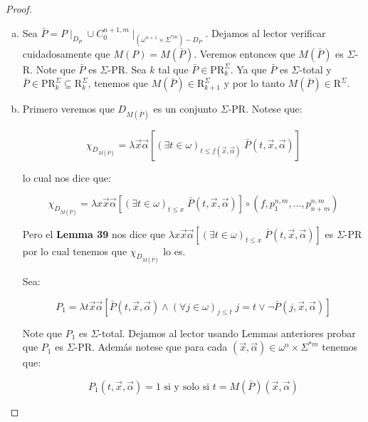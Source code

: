   \begin{proof}
    \begin{enumerate}[a)]
      \item Sea $\bar{P} = P \mid_{D_{P}} \cup C_{0}^{n+1,m} \mid_{(\omega^{n+1} \times \Sigma^{\ast m})-D_{P}}$.
        Dejamos al lector verificar cuidadosamente que $M(P) = M(\bar{P})$. Veremos entonces que $M(\bar{P})$ es
        $\Sigma$-R. Note que $\bar{P}$ es $\Sigma$-PR. Sea $k$ tal que $\bar{P} \in \mathrm{PR}_{k}^{\Sigma}$. Ya que
        $\bar{P}$ es $\Sigma$-total y $\bar{P} \in \mathrm{PR}_{k}^{\Sigma} \subseteq \mathrm{R}_{k}^{\Sigma}$, tenemos
        que $M(\bar{P}) \in \mathrm{R}_{k+1}^{\Sigma}$ y por lo tanto $M(\bar{P}) \in \mathrm{R}^{\Sigma}$.

      \item Primero veremos que $D_{M(\bar{P})}$ es un conjunto $\Sigma$-PR. Notese que:

        \[
          \chi_{D_{M(\bar{P})}} = \lambda \vec{x}\vec{\alpha}\left[(\exists t\in \omega)_{t\leq f(\vec{x},\vec{\alpha})}
          \; \bar{P}(t,\vec{x},\vec{\alpha})\right]
        \]

        \par lo cual nos dice que:

        \[
          \chi_{D_{M(\bar{P})}} = \lambda x\vec{x}\vec{\alpha}\left[(\exists t\in \omega)_{t\leq x} \;
          \bar{P}(t,\vec{x},\vec{\alpha})\right] \circ (f,p_{1}^{n,m},\dotsc,p_{n+m}^{n,m})
        \]

        \par Pero el \textbf{Lemma 39} nos dice que $\lambda x\vec{x}\vec{\alpha} \left[(\exists t\in \omega)_{t\leq x}
        \; \bar{P}(t,\vec{x},\vec{\alpha})\right]$ es $\Sigma$-PR por lo cual tenemos que $\chi _{D_{M(\bar{P})}}$ lo es.

        \par Sea:

        \[
          P_{1} = \lambda t\vec{x}\vec{\alpha}\left[\bar{P}(t,\vec{x},\vec{\alpha}) \wedge (\forall j\in \omega)_{j\leq
          t} \; j=t \vee \lnot \bar{P}(j,\vec{x},\vec{\alpha})\right]
        \]

        \par Note que $P_{1}$ es $\Sigma$-total. Dejamos al lector usando Lemmas anteriores probar que $P_{1}$ es
        $\Sigma$-PR. Además notese que para cada $(\vec{x},\vec{\alpha}) \in \omega^{n} \times \Sigma^{\ast m}$ tenemos
        que:

        \[
          P_{1}(t,\vec{x},\vec{\alpha}) = 1 \text{ si y solo si } t = M(\bar{P})(\vec{x},\vec{\alpha})
        \]


\end{enumerate}
\end{proof}
